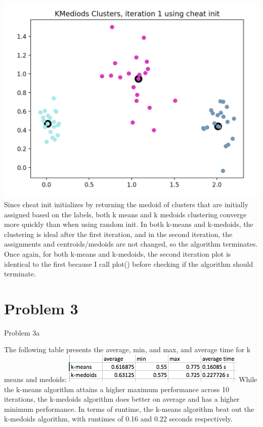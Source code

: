 \documentclass[11pt]{article}
\newcommand{\solution}[1]{{{\color{blue}{\bf Solution:} {#1}}}}
\begin{document}
{\includegraphics[scale=0.5]{kmed-cheat-iter-1.png} \newline{}
Since cheat init initializes by returning the medoid of clusters that are initially assigned based on the labels, both k means and k medoids clustering converge more quickly than when using random init. In both k-means and k-medoids, the clustering is ideal after the first iteration, and in the second iteration, the assignments and centroids/medoids are not changed, so the algorithm terminates. Once again, for both k-means and k-medoids, the second iteration plot is identical to the first because I call plot() before checking if the algorithm should terminate. 
}

\newpage

\section{Problem 3}

\item Problem 3a

\solution{
The following table presents the average, min, and max, and average time for k means and medoids: \newline{}
\includegraphics[scale=1.0]{datas.png}
\newline{}
While the k-means algorithm attains a higher maximum performance across 10 iterations, the k-medoids algorithm does better on average and has a higher minimum performance. In terms of runtime, the k-means algorithm beat out the k-medoids algorithm, with runtimes of 0.16 and 0.22 seconds respectively. 
}
\end{document}
